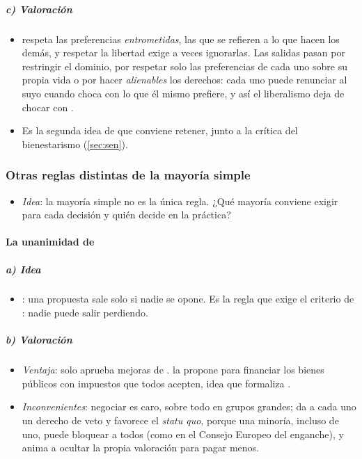 \documentclass[11pt]{article}
\begin{document}
\subparagraph{c) Valoración}

\begin{itemize}
\item {} respeta las preferencias \emph{entrometidas}, las que se refieren a lo que hacen los demás, y respetar la libertad exige a veces ignorarlas. Las salidas pasan por restringir el dominio, por respetar solo las preferencias de cada uno sobre su propia vida o por hacer \emph{alienables} los derechos: cada uno puede renunciar al suyo cuando choca con lo que él mismo prefiere, y así el liberalismo deja de chocar con \nocite{Gibbard1974Pareto}.
\item Es la segunda idea de  que conviene retener, junto a la crítica del bienestarismo (\ref{sec:sen}).
\end{itemize}

\subsubsection{Otras reglas distintas de la mayoría simple}\label{sec:otras-reglas}

\begin{itemize}
\item \emph{Idea}: la mayoría simple no es la única regla. ¿Qué mayoría conviene exigir para cada decisión y quién decide en la práctica?
\end{itemize}

\paragraph{La unanimidad de }

\subparagraph{a) Idea}

\begin{itemize}
\item {}\nocite{Wicksell1896Finanztheoretische}: una propuesta sale solo si nadie se opone. Es la regla que exige el criterio de : nadie puede salir perdiendo.
\end{itemize}

\subparagraph{b) Valoración}

\begin{itemize}
\item \emph{Ventaja}: solo aprueba mejoras de .  la propone para financiar los bienes públicos con impuestos que todos acepten, idea que formaliza  .
\item \emph{Inconvenientes}: negociar es caro, sobre todo en grupos grandes; da a cada uno un derecho de veto y favorece el \emph{statu quo}, porque una minoría, incluso de uno, puede bloquear a todos (como en el Consejo Europeo del enganche), y anima a ocultar la propia valoración para pagar menos.
\end{itemize}
\end{document}
